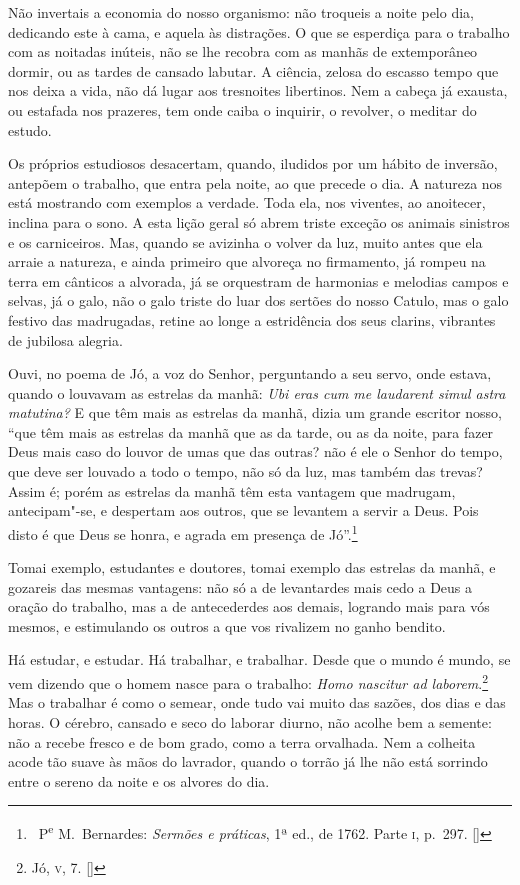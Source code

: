 Não invertais a economia do nosso organismo: não troqueis a noite
pelo dia, dedicando este à cama, e aquela às distrações. O que se
esperdiça para o trabalho com as noitadas inúteis, não se lhe recobra
com as manhãs de extemporâneo dormir, ou as tardes de cansado labutar.
A ciência, zelosa do escasso tempo que nos deixa a vida, não dá lugar
aos tresnoites libertinos. Nem a cabeça já exausta, ou estafada nos
prazeres, tem onde caiba o inquirir, o revolver, o meditar do estudo.

Os próprios estudiosos desacertam, quando, iludidos por um hábito
de inversão, antepõem o trabalho, que entra pela noite, ao que precede
o dia. A natureza nos está mostrando com exemplos a verdade. Toda ela,
nos viventes, ao anoitecer, inclina para o sono. A esta lição geral só
abrem triste exceção os animais sinistros e os carniceiros. Mas, quando
se avizinha o volver da luz, muito antes que ela arraie a natureza, e
ainda primeiro que alvoreça no firmamento, já rompeu na terra em
cânticos a alvorada, já se orquestram de harmonias e melodias campos e
selvas, já o galo, não o galo triste do luar dos sertões do nosso
Catulo, mas o galo festivo das
madrugadas, retine ao longe a estridência dos seus clarins, 
vibrantes de jubilosa alegria.

Ouvi, no poema de Jó, a voz do Senhor, perguntando a seu
servo, onde estava, quando o louvavam as estrelas da manhã: \textit{Ubi
eras cum me laudarent simul astra matutina?} E que têm mais as estrelas
da manhã, dizia um grande escritor nosso, ``que têm mais as estrelas da manhã
que as da tarde, ou as da noite, para fazer Deus mais caso do louvor de
umas que das outras? não é ele o Senhor do tempo, que deve ser louvado
a todo o tempo, não só da luz, mas também das trevas? Assim é; porém as
estrelas da manhã têm esta vantagem que madrugam, antecipam"-se, e
despertam aos outros, que se levantem a servir a Deus. Pois disto é que
Deus se honra, e agrada em presença de Jó''.\footnote{\ P\textsuperscript{e} M.~Bernardes: 
\textit{Sermões e práticas}, 1ª ed., de 1762. Parte \textsc{i}, p.~297. []}

Tomai exemplo, estudantes e doutores, tomai exemplo das estrelas
da manhã, e gozareis das mesmas vantagens: não só a de levantardes mais
cedo a Deus a oração do trabalho, mas a de antecederdes aos demais,
logrando mais para vós mesmos, e estimulando os outros a que vos
rivalizem no ganho bendito.

Há estudar, e estudar. Há trabalhar, e trabalhar. Desde que o
mundo é mundo, se vem dizendo que o homem nasce para o trabalho:
\textit{Homo nascitur ad laborem}.\footnote{ Jó, \textsc{v}, 7. []} 
Mas o trabalhar é como o semear, onde tudo vai muito das sazões,
dos dias e das horas. O cérebro, cansado e seco do laborar diurno, não
acolhe bem a semente: não a recebe fresco e de bom grado, como a terra
orvalhada. Nem a colheita acode tão suave às mãos do lavrador, quando o
torrão já lhe não está sorrindo entre o sereno da noite e os alvores do dia.

